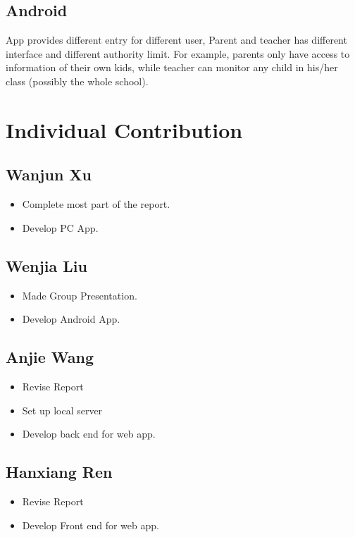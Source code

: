 \documentclass{article}
\begin{document}
\subsection{Android}

 App provides different entry for different user, Parent and teacher has different interface and different authority limit. For example, parents only have access to information of their own kids, while teacher can monitor any child in his/her class (possibly the whole school).
 

\section{Individual Contribution}
\subsection{Wanjun Xu}
\begin{itemize}
	\item Complete most part of the report.
	\item Develop PC App.
\end{itemize}

\subsection{Wenjia Liu}
\begin{itemize}
	\item Made Group Presentation.
	\item Develop Android App.
\end{itemize}

\subsection{Anjie Wang}
\begin{itemize}
	\item Revise Report
	\item Set up local server 
	\item Develop back end for web app.
\end{itemize}

\subsection{Hanxiang Ren}
\begin{itemize}
	\item Revise Report
	\item Develop Front end for web app.
\end{itemize}
\end{document}
